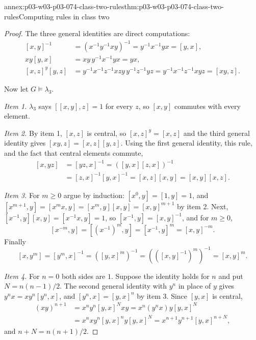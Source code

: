 \begin{annexitem}{annex:p03-w03-p03-074-class-two-rules}{thm:p03-w03-p03-074-class-two-rules}{Computing rules in class two}
\begin{proof}
The three general identities are direct computations:
\[\begin{aligned}
 [x,y]^{-1}&=(x^{-1}y^{-1}xy)^{-1}=y^{-1}x^{-1}yx=[y,x],\\
 xy[y,x]&=xy\,y^{-1}x^{-1}yx=yx,\\
 {}[x,z]^y[y,z]&=y^{-1}x^{-1}z^{-1}xzy\,y^{-1}z^{-1}yz
   =y^{-1}x^{-1}z^{-1}xyz=[xy,z].
\end{aligned}\]

Now let \(G\models\lambda_3\).

\emph{Item 1.} \(\lambda_3\) says \([[x,y],z]=1\) for every \(z\), so
\([x,y]\) commutes with every element.

\emph{Item 2.} By item 1, \([x,z]\) is central, so \([x,z]^y=[x,z]\) and
the third general identity gives \([xy,z]=[x,z][y,z]\). Using the first
general identity, this rule, and the fact that central elements commute,
\[\begin{aligned}
 [x,yz]&=[yz,x]^{-1}=([y,x][z,x])^{-1}\\
 &=[z,x]^{-1}[y,x]^{-1}=[x,z][x,y]=[x,y][x,z].
\end{aligned}\]

\emph{Item 3.} For \(m\ge0\) argue by induction: \([x^0,y]=[1,y]=1\), and
\([x^{m+1},y]=[x^mx,y]=[x^m,y][x,y]=[x,y]^{m+1}\) by item 2. Next,
\([x^{-1},y][x,y]=[x^{-1}x,y]=1\), so \([x^{-1},y]=[x,y]^{-1}\), and for
\(m\ge0\),
\[
 [x^{-m},y]=[(x^{-1})^m,y]=[x^{-1},y]^m=[x,y]^{-m}.
\]
Finally
\[
 [x,y^m]=[y^m,x]^{-1}=([y,x]^m)^{-1}=(([x,y]^{-1})^m)^{-1}=[x,y]^m.
\]

\emph{Item 4.} For \(n=0\) both sides are \(1\). Suppose the identity holds
for \(n\) and put \(N=n(n-1)/2\). The second general identity with \(y^n\)
in place of \(y\) gives \(y^nx=xy^n[y^n,x]\), and \([y^n,x]=[y,x]^n\) by
item 3. Since \([y,x]\) is central,
\[\begin{aligned}
 (xy)^{n+1}&=x^ny^n[y,x]^Nxy
 =x^n(y^nx)y[y,x]^N\\
 &=x^nxy^n[y,x]^ny[y,x]^N
 =x^{n+1}y^{n+1}[y,x]^{n+N},
\end{aligned}\]
and \(n+N=n(n+1)/2\).
\end{proof}
\end{annexitem}

